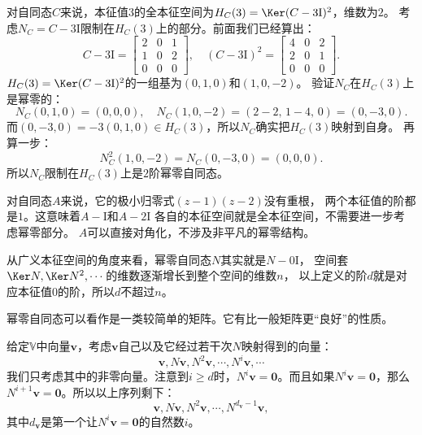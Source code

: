 \documentclass[12pt,UTF8]{ctexbook}
\begin{document}
对自同态$C$来说，本征值$3$的全本征空间为$H_C(3) = \Ker(C-3\mathrm{I})^2$，维数为$2$。
考虑$N_C = C - 3\mathrm{I}$限制在$H_C(3)$上的部分。前面我们已经算出：
$$
C - 3\mathrm{I} = \begin{bmatrix} 2 & 0 & 1 \\ 1 & 0 & 2 \\ 0 & 0 & 0 \end{bmatrix}, \quad (C-3\mathrm{I})^2 = \begin{bmatrix} 4 & 0 & 2 \\ 2 & 0 & 1 \\ 0 & 0 & 0 \end{bmatrix}.
$$
$H_C(3) = \Ker(C-3\mathrm{I})^2$的一组基为$(0,1,0)$和$(1,0,-2)$。
验证$N_C$在$H_C(3)$上是幂零的：
$$
N_C(0,1,0) = (0, 0, 0), \quad N_C(1,0,-2) = (2-2,\, 1-4,\, 0) = (0,-3,0).
$$
而$(0,-3,0) = -3(0,1,0) \in H_C(3)$，所以$N_C$确实把$H_C(3)$映射到自身。
再算一步：
$$
N_C^2(1,0,-2) = N_C(0,-3,0) = (0, 0, 0).
$$
所以$N_C$限制在$H_C(3)$上是$2$阶幂零自同态。

对自同态$A$来说，它的极小归零式$(z-1)(z-2)$没有重根，
两个本征值的阶都是$1$。这意味着$A - \mathrm{I}$和$A - 2\mathrm{I}$
各自的本征空间就是全本征空间，不需要进一步考虑幂零部分。
$A$可以直接对角化，不涉及非平凡的幂零结构。

从广义本征空间的角度来看，幂零自同态$N$其实就是$N - 0\mathrm{I}$，
空间套$\Ker N, \Ker N^2, \cdots$的维数逐渐增长到整个空间的维数$n$，
以上定义的阶$d$就是对应本征值$0$的阶，所以$d$不超过$n$。

幂零自同态可以看作是一类较简单的矩阵。它有比一般矩阵更“良好”的性质。

给定$\mathbb{V}$中向量$\mathbf{v}$，考虑$\mathbf{v}$自己以及它经过若干次$N$映射得到的向量：
$$ \mathbf{v}, N\mathbf{v}, N^2 \mathbf{v}, \cdots , N^i \mathbf{v} ,\cdots $$
我们只考虑其中的非零向量。注意到$i \geqslant d$时，$N^i \mathbf{v} = \mathbf{0}$。而且如果$N^i \mathbf{v} = \mathbf{0}$，那么$N^{i+1} \mathbf{v} = \mathbf{0}$。所以以上序列剩下：
$$ \mathbf{v}, N\mathbf{v}, N^2 \mathbf{v}, \cdots , N^{d_\mathbf{v} - 1} \mathbf{v}, $$
其中$d_\mathbf{v}$是第一个让$N^i \mathbf{v} = \mathbf{0}$的自然数$i$。
\end{document}
